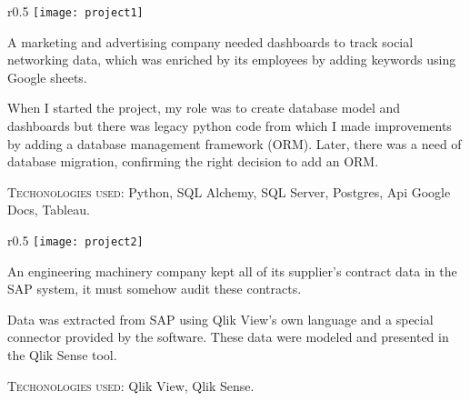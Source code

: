 


    \cvparagraph
    {
      \begin{wrapfigure}{r}{0.5\textwidth}
        \centering
        \vspace{-10pt}
        \texttt{[image: project1]}
      \end{wrapfigure}
      A marketing and advertising company needed dashboards to track social networking data, which was enriched by its employees by adding keywords using Google sheets.

      When I started the project, my role was to create database model and dashboards but there was legacy python code from which I made improvements by adding a database management framework (ORM). Later, there was a need of database migration, confirming the right decision to add an ORM.

      \textsc{Techonologies used}: Python, SQL Alchemy, SQL Server, Postgres, Api Google Docs, Tableau.
      \vfill
    }



    \cvparagraph
    {
      \begin{wrapfigure}{r}{0.5\textwidth}
        \centering
        \vspace{-10pt}
        \texttt{[image: project2]}
      \end{wrapfigure}
      An engineering machinery company kept all of its supplier's contract data in the SAP system, it must somehow audit these contracts.

      Data was extracted from SAP using Qlik View's own language and a special connector provided by the software. These data were modeled and presented in the Qlik Sense tool.

      \textsc{Techonologies used}: Qlik View, Qlik Sense.
      \vfill
    }


